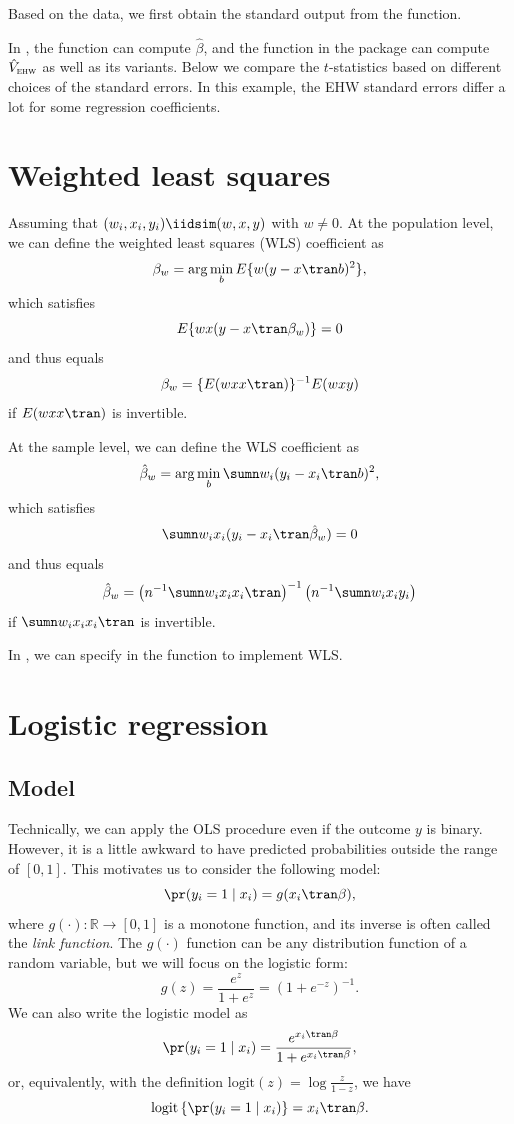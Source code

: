 Based on the  data, we first obtain the standard output from the  function. 



In , the  function can compute $\hat{\beta}$, and the  function in the package  can compute $\hat{V}_\textsc{ehw} $ as well as its variants. Below we compare the $t$-statistics based on different choices of the standard errors. In this example, the EHW standard errors differ a lot for some regression coefficients. 





\section{Weighted least squares}
\label{sec::appendix-wls}


Assuming that $(w_i, x_i, y_i) \iidsim (w, x, y)$ with $w\neq 0$. At the population level, we can define the weighted least squares (WLS) coefficient as
$$
\beta_w = \arg\min_b  E\{  w (y-x \tran b)^{2}    \},
$$
which satisfies
$$
E  \{  w x (y-x \tran \beta_w ) \} = 0
$$
and thus equals
$$
\beta_w  = \{  E  ( w xx\tran ) \}^{-1} E(  w xy )
$$
if $E  ( w xx\tran )$ is invertible. 

At the sample level, we can define the WLS coefficient as
$$
\hat{\beta}_w = \arg\min_b \sumn w_i (y_i-x_i \tran b)^{2},
$$
which satisfies
$$
\sumn w_i x_i (y_i -x_i \tran \hat\beta_w ) = 0
$$
and thus equals
$$
\hat \beta_w  =  \left(  n^{-1} \sumn   w_i x_ix_i\tran \right)^{-1} \left(   n^{-1} \sumn   w_i x_i y_i \right)
$$
if $\sumn   w_i x_ix_i\tran$ is invertible. 

In , we can specify  in the  function to implement WLS. 



\section{Logistic regression}\label{sec::logistic-regression}




 
  
 \subsection{Model}
Technically, we can apply the OLS procedure even if the outcome $y$ is binary. However, it is a little awkward to have predicted probabilities outside the range of $[0,1]$. This motivates us to consider the
following model:
\[
\pr(y_{i}=1\mid x_{i})=g(x_{i} \tran \beta),
\]
where $g(\cdot):\mathbb{R}\rightarrow[0,1]$ is a monotone function,
and its inverse is often called the {\it  link function}. The $g(\cdot)$ function can be any distribution function of a random variable, but we will focus on the logistic form:
$$
g(z) =  \frac{ e^z }{1 + e^z} = (1 + e^{-z})^{-1}. 
$$
We can also write the logistic model
as
$$
\pr(y_{i}=1\mid x_{i}) =\frac{e^{x_{i} \tran \beta}}{1+e^{x_{i} \tran \beta}},
$$
or, equivalently, with the definition $\text{logit}(z) = \log\frac{z}{1-z}$, we have 
\[
\text{logit}\left\{ \pr(y_{i}=1\mid x_{i})\right\}  =x_{i} \tran \beta.
\]

